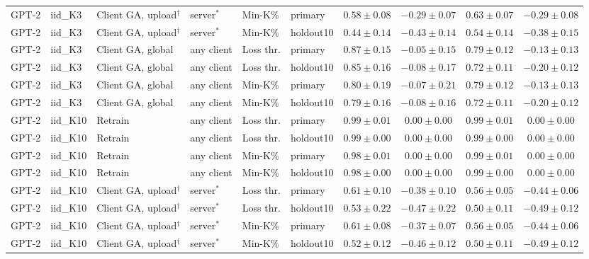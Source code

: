 {\begin{longtable}{@{\extracolsep{\fill}}llllllcccc@{}}
GPT-2 & iid\_K3 & Client GA, upload$^{\dagger}$ & server$^{*}$ & Min-K\% & primary & $0.58 \pm 0.08$ & $-0.29 \pm 0.07$ & $0.63 \pm 0.07$ & $-0.29 \pm 0.08$ \\
GPT-2 & iid\_K3 & Client GA, upload$^{\dagger}$ & server$^{*}$ & Min-K\% & holdout10 & $0.44 \pm 0.14$ & $-0.43 \pm 0.14$ & $0.54 \pm 0.14$ & $-0.38 \pm 0.15$ \\
GPT-2 & iid\_K3 & Client GA, global & any client & Loss thr. & primary & $0.87 \pm 0.15$ & $-0.05 \pm 0.15$ & $0.79 \pm 0.12$ & $-0.13 \pm 0.13$ \\
GPT-2 & iid\_K3 & Client GA, global & any client & Loss thr. & holdout10 & $0.85 \pm 0.16$ & $-0.08 \pm 0.17$ & $0.72 \pm 0.11$ & $-0.20 \pm 0.12$ \\
GPT-2 & iid\_K3 & Client GA, global & any client & Min-K\% & primary & $0.80 \pm 0.19$ & $-0.07 \pm 0.21$ & $0.79 \pm 0.12$ & $-0.13 \pm 0.13$ \\
GPT-2 & iid\_K3 & Client GA, global & any client & Min-K\% & holdout10 & $0.79 \pm 0.16$ & $-0.08 \pm 0.16$ & $0.72 \pm 0.11$ & $-0.20 \pm 0.12$ \\
GPT-2 & iid\_K10 & Retrain & any client & Loss thr. & primary & $0.99 \pm 0.01$ & $0.00 \pm 0.00$ & $0.99 \pm 0.01$ & $0.00 \pm 0.00$ \\
GPT-2 & iid\_K10 & Retrain & any client & Loss thr. & holdout10 & $0.99 \pm 0.00$ & $0.00 \pm 0.00$ & $0.99 \pm 0.00$ & $0.00 \pm 0.00$ \\
GPT-2 & iid\_K10 & Retrain & any client & Min-K\% & primary & $0.98 \pm 0.01$ & $0.00 \pm 0.00$ & $0.99 \pm 0.01$ & $0.00 \pm 0.00$ \\
GPT-2 & iid\_K10 & Retrain & any client & Min-K\% & holdout10 & $0.98 \pm 0.00$ & $0.00 \pm 0.00$ & $0.99 \pm 0.00$ & $0.00 \pm 0.00$ \\
GPT-2 & iid\_K10 & Client GA, upload$^{\dagger}$ & server$^{*}$ & Loss thr. & primary & $0.61 \pm 0.10$ & $-0.38 \pm 0.10$ & $0.56 \pm 0.05$ & $-0.44 \pm 0.06$ \\
GPT-2 & iid\_K10 & Client GA, upload$^{\dagger}$ & server$^{*}$ & Loss thr. & holdout10 & $0.53 \pm 0.22$ & $-0.47 \pm 0.22$ & $0.50 \pm 0.11$ & $-0.49 \pm 0.12$ \\
GPT-2 & iid\_K10 & Client GA, upload$^{\dagger}$ & server$^{*}$ & Min-K\% & primary & $0.61 \pm 0.08$ & $-0.37 \pm 0.07$ & $0.56 \pm 0.05$ & $-0.44 \pm 0.06$ \\
GPT-2 & iid\_K10 & Client GA, upload$^{\dagger}$ & server$^{*}$ & Min-K\% & holdout10 & $0.52 \pm 0.12$ & $-0.46 \pm 0.12$ & $0.50 \pm 0.11$ & $-0.49 \pm 0.12$ \\

\end{longtable}}
